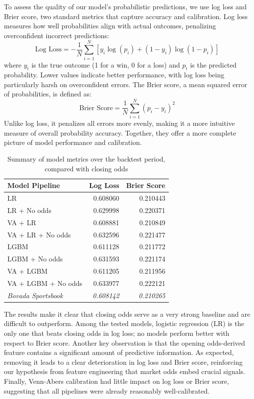 \documentclass[12pt,twoside]{report}
\begin{document}
To assess the quality of our model’s probabilistic predictions, we use log loss and Brier score, two standard metrics that capture accuracy and calibration. Log loss measures how well probabilities align with actual outcomes, penalizing overconfident incorrect predictions:
$$\text{Log Loss} = -\frac{1}{N} \sum_{i=1}^{N} \left[ y_i \log(p_i) + (1 - y_i) \log (1 - p_i) \right]$$
where $y_i$ is the true outcome (1 for a win, 0 for a loss) and $p_i$ is the predicted probability. Lower values indicate better performance, with log loss being particularly harsh on overconfident errors. The Brier score, a mean squared error of probabilities, is defined as:
$$\text{Brier Score} = \frac{1}{N} \sum_{i=1}^{N} (p_i - y_i)^2$$
Unlike log loss, it penalizes all errors more evenly, making it a more intuitive measure of overall probability accuracy. Together, they offer a more complete picture of model performance and calibration.

\begin{table}[!htb]
\centering
\begin{tabular}{@{}lrr@{}}
\toprule
Model Pipeline                           & Log Loss          & Brier Score       \\ \midrule
LR                      & 0.608060 & 0.210443 \\
LR + No odds            & 0.629998          & 0.220371          \\
VA + LR           & 0.608881          & 0.210849          \\
VA + LR + No odds & 0.632596          & 0.221477          \\
LGBM                                 & 0.611128          & 0.211772          \\
LGBM + No odds                      & 0.631593          & 0.221174          \\
VA + LGBM                      & 0.611205          & 0.211956          \\
VA + LGBM + No odds            & 0.633977          & 0.222121          \\ \midrule
\textit{Bovada Sportsbook}               & \textit{0.608142} & \textit{0.210265} \\ \bottomrule
\end{tabular}
\caption{Summary of model metrics over the backtest period, compared with closing odds}
\end{table}

The results make it clear that closing odds serve as a very strong baseline and are difficult to outperform. Among the tested models, logistic regression (LR) is the only one that beats closing odds in log loss; no models perform better with respect to Brier score. Another key observation is that the opening odds-derived feature contains a significant amount of predictive information. As expected, removing it leads to a clear deterioration in log loss and Brier score, reinforcing our hypothesis from feature engineering that market odds embed crucial signals. Finally, Venn-Abers calibration had little impact on log loss or Brier score, suggesting that all pipelines were already reasonably well-calibrated.
\end{document}
